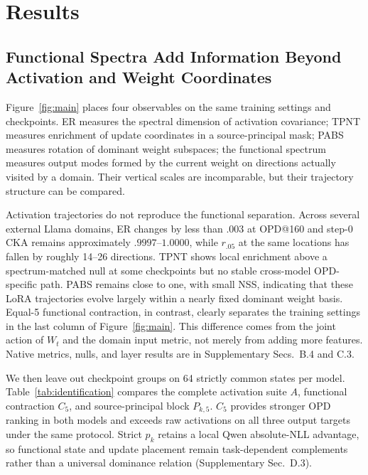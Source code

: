 \section{Results}



\subsection{Functional Spectra Add Information Beyond Activation and Weight Coordinates}

Figure~\ref{fig:main} places four observables on the same training settings and checkpoints.
ER measures the spectral dimension of activation covariance; TPNT measures enrichment of
update coordinates in a source-principal mask; PABS measures rotation of dominant weight
subspaces; the functional spectrum measures output modes formed by the current weight on
directions actually visited by a domain. Their vertical scales are incomparable, but
their trajectory structure can be compared.

Activation trajectories do not reproduce the functional separation. Across several
external Llama domains, ER changes by less than $.003$ at OPD@160 and step-0 CKA remains
approximately $.9997$--$1.0000$, while $r_{.05}$ at the same locations has fallen by
roughly 14--26 directions. TPNT shows local enrichment above a spectrum-matched null at
some checkpoints but no stable cross-model OPD-specific path. PABS remains close to one,
with small NSS, indicating that these LoRA trajectories evolve largely within a nearly
fixed dominant weight basis. Equal-5 functional contraction, in contrast, clearly
separates the training settings in the last column of Figure~\ref{fig:main}. This
difference comes from the joint action of $W_t$ and the domain input metric, not merely
from adding more features. Native metrics, nulls, and layer results are in Supplementary
Secs.~B.4 and C.3.

We then leave out checkpoint groups on 64 strictly common states per model.
Table~\ref{tab:identification} compares the complete activation suite $A$, functional
contraction $C_5$, and source-principal block $P_{k,5}$. $C_5$ provides stronger OPD
ranking in both models and exceeds raw activations on all three output targets under the
same protocol. Strict $p_k$ retains a local Qwen absolute-NLL advantage, so functional
state and update placement remain task-dependent complements rather than a universal
dominance relation (Supplementary Sec.~D.3).


